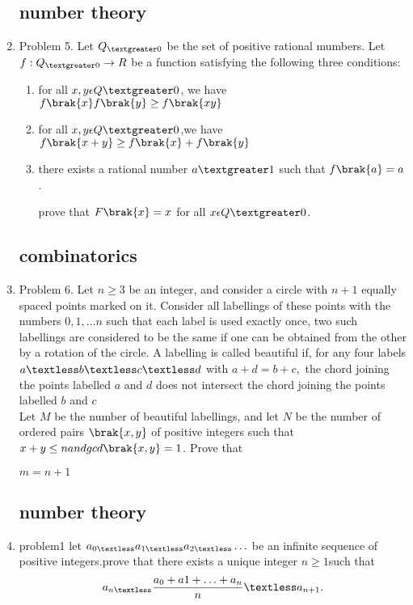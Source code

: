 \documentclass{article}
\begin{document}
\begin{enumerate}
	\subsection*{number theory}
\item Problem 5. Let $ Q_{\textgreater 0}$ be the set of positive rational mumbers. Let $f: Q_{\textgreater 0} \rightarrow R$ be a function satisfying the following three conditions:
	\begin{enumerate}
		\item for all $x,y\epsilon  Q\textgreater0$, we have $f\brak{x} f\brak{y} \geq  f\brak{xy}$
		\item for all $x,y\epsilon Q\textgreater0$,we have$f\brak{x+y} \geq f\brak{x}+f\brak{y}$
		\item there exists a rational number $a\textgreater 1$ such that $f\brak{a}=a$.
			
		prove that $F\brak{x}=x$ for all $x \epsilon Q\textgreater0$.
       \end{enumerate}		
		\subsection*{combinatorics}
\item Problem 6. Let $n \geq  3$ be an integer, and consider a circle with $n+1$ equally spaced points marked on it. Consider all labellings of these points with the numbers $0,1,\ldots n$ such that each label is used exactly once, two such labellings are considered to be the same if one can be obtained from the other by a rotation of the circle. A labelling is called beautiful if, for any four labels $a\textless b\textless c\textless d$ with $a+d=b+c,$ the chord joining the points labelled $a$ and $d$ does not intersect the chord joining the points labelled $b$ and $c$ \\

Let $M$ be the number of beautiful labellings, and let $N$ be the number of ordered pairs $\brak{x, y}$ of
		positive integers such that $x+y\leq n and gcd \brak{x,y} = 1$. Prove that
                                                                
								$m=n+1$
\newpage 
		\subsection*{number theory}
\item problem1 let $a_{0\textless} a_{1\textless} a_{2 \textless} \ldots$ be an infinite sequence of positive integers.prove that there exists a unique integer $n\geq 1$such that\\
	\begin{align}
	a_{n\textless }\frac{a_0+a1+\ldots+a_n}{n} \textless a_{n+1}.
	\end{align}

\end{enumerate}
\end{document}
